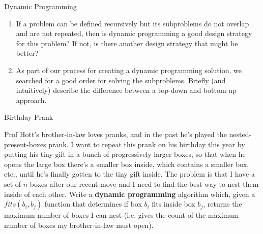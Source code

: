 \documentclass[10pt]{article}
\begin{document}
\thispagestyle{empty}
\handout





\begin{problem}Dynamic Programming\end{problem}

\begin{enumerate}
    \item If a problem can be defined recursively but its subproblems do not overlap and are not repeated, then is dynamic programming a good design strategy for this problem?  If not, is there another design strategy that might be better?
    
    \soln
    
    
    \item As part of our process for creating a dynamic programming solution, we searched for a good order for solving the subproblems.  Briefly (and intuitively) describe the difference between a top-down and bottom-up approach.  
    
    \soln
    
    
\end{enumerate}




\begin{problem}Birthday Prank\end{problem}

Prof Hott's brother-in-law loves pranks, and in the past he's played the nested-present-boxes prank.  I want to repeat this prank on his birthday this year by putting his tiny gift in a bunch of progressively larger boxes, so that when he opens the large box there's a smaller box inside, which contains a smaller box, etc., until he's finally gotten to the tiny gift inside.  The problem is that I have a set of $n$ boxes after our recent move and I need to find the best way to nest them inside of each other.  Write a \textbf{dynamic programming} algorithm which, given a $fits(b_i,b_j)$ function that determines if box $b_i$ fits inside box $b_j$, returns the maximum number of boxes I can nest (i.e. gives the count of the maximum number of boxes my brother-in-law must open).
\end{document}
